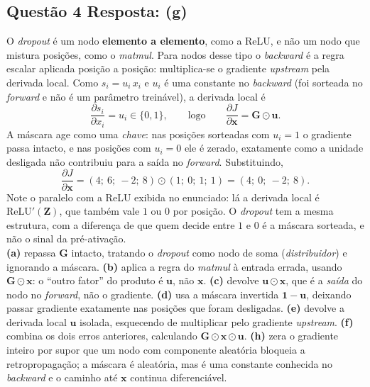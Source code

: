 \documentclass[11pt,a4paper]{article}
\begin{document}
\subsection*{Questão 4 \textemdash{} Resposta: (g)}
O \textit{dropout} é um nodo \textbf{elemento a elemento}, como a ReLU, e não um nodo que mistura posições, como o \textit{matmul}. Para nodos desse tipo o \textit{backward} é a regra escalar aplicada posição a posição: multiplica-se o gradiente \textit{upstream} pela derivada local. Como $s_i = u_i\,x_i$ e $u_i$ é uma constante no \textit{backward} (foi sorteada no \textit{forward} e não é um parâmetro treinável), a derivada local é
\[
\frac{\partial s_i}{\partial x_i} = u_i \in \{0, 1\},
\qquad\text{logo}\qquad
\frac{\partial J}{\partial \mathbf{x}} = \mathbf{G} \odot \mathbf{u}.
\]
A máscara age como uma \emph{chave}: nas posições sorteadas com $u_i = 1$ o gradiente passa intacto, e nas posições com $u_i = 0$ ele é zerado, exatamente como a unidade desligada não contribuiu para a saída no \textit{forward}. Substituindo,
\[
\frac{\partial J}{\partial \mathbf{x}} = (4;\ 6;\ -2;\ 8) \odot (1;\ 0;\ 1;\ 1) = (4;\ 0;\ -2;\ 8).
\]
Note o paralelo com a ReLU exibida no enunciado: lá a derivada local é $\mathrm{ReLU}'(\mathbf{Z})$, que também vale $1$ ou $0$ por posição. O \textit{dropout} tem a mesma estrutura, com a diferença de que quem decide entre $1$ e $0$ é a máscara sorteada, e não o sinal da pré-ativação.\\
\textbf{(a)} repassa $\mathbf{G}$ intacto, tratando o \textit{dropout} como nodo de soma (\textit{distribuidor}) e ignorando a máscara.
\textbf{(b)} aplica a regra do \textit{matmul} à entrada errada, usando $\mathbf{G} \odot \mathbf{x}$: o ``outro fator'' do produto é $\mathbf{u}$, não $\mathbf{x}$.
\textbf{(c)} devolve $\mathbf{u} \odot \mathbf{x}$, que é a \emph{saída} do nodo no \textit{forward}, não o gradiente.
\textbf{(d)} usa a máscara invertida $\mathbf{1} - \mathbf{u}$, deixando passar gradiente exatamente nas posições que foram desligadas.
\textbf{(e)} devolve a derivada local $\mathbf{u}$ isolada, esquecendo de multiplicar pelo gradiente \textit{upstream}.
\textbf{(f)} combina os dois erros anteriores, calculando $\mathbf{G} \odot \mathbf{x} \odot \mathbf{u}$.
\textbf{(h)} zera o gradiente inteiro por supor que um nodo com componente aleatória bloqueia a retropropagação; a máscara é aleatória, mas é uma constante conhecida no \textit{backward} e o caminho até $\mathbf{x}$ continua diferenciável.
\end{document}

